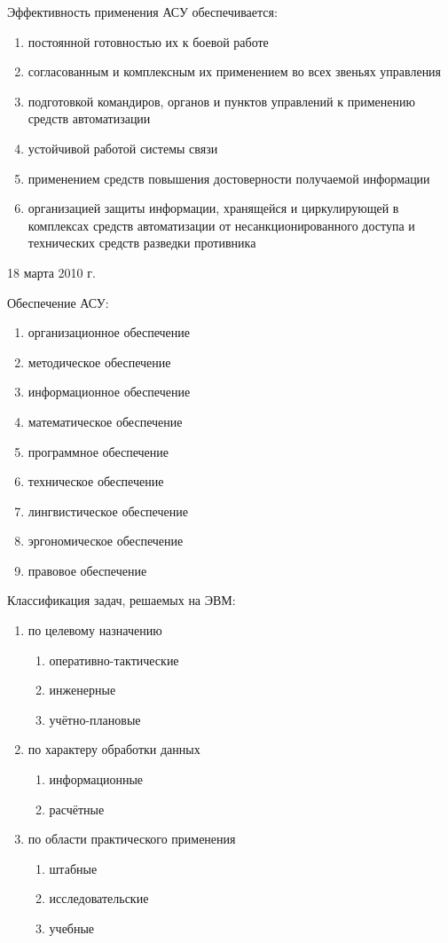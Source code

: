 \documentclass[a4paper,12pt]{article}
\begin{document}
	Эффективность применения АСУ обеспечивается:
	\begin{enumerate}
		\item постоянной готовностью их к боевой работе
		\item согласованным и комплексным их применением во всех звеньях управления
		\item подготовкой командиров, органов и пунктов управлений к применению средств
		автоматизации
		\item устойчивой работой системы связи
		\item применением средств повышения достоверности получаемой информации
		\item организацией защиты информации, хранящейся и циркулирующей в комплексах средств 
		автоматизации от несанкционированного доступа и технических средств разведки противника
	\end{enumerate}
	\newpage
	\centerline{18 марта 2010 г.}
	Обеспечение АСУ:
	\begin{enumerate}
		\item организационное обеспечение
		\item методическое обеспечение
		\item информационное обеспечение
		\item математическое обеспечение
		\item программное обеспечение
		\item техническое обеспечение
		\item лингвистическое обеспечение
		\item эргономическое обеспечение
		\item правовое обеспечение
	\end{enumerate}
	Классификация задач, решаемых на ЭВМ:
	\begin{enumerate}
		\item по целевому назначению
			\begin{enumerate}
				\item оперативно-тактические
				\item инженерные
				\item учётно-плановые
			\end{enumerate}
		\item по характеру обработки данных
			\begin{enumerate}
				\item информационные
				\item расчётные
			\end{enumerate}
		\item по области практического применения
			\begin{enumerate}
				\item штабные
				\item исследовательские
				\item учебные
			\end{enumerate}
	\end{enumerate}
\end{document}
